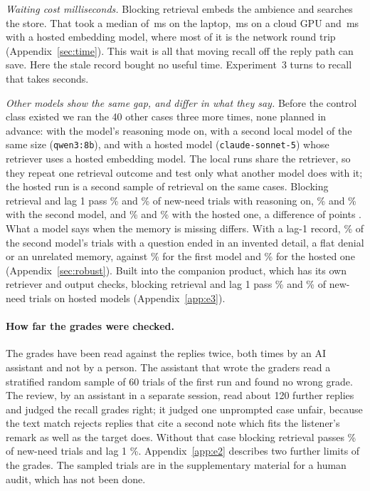 \documentclass[10pt]{article}
\begin{document}
\emph{Waiting cost milliseconds.} Blocking retrieval embeds the ambience and searches the store. That took a median of \PreBlockMed\,ms on the laptop, \CloudRecallMs\,ms on a cloud GPU and \HsRecallMs\,ms with a hosted embedding model, where most of it is the network round trip (Appendix~\ref{sec:time}). This wait is all that moving recall off the reply path can save. Here the stale record bought no useful time. Experiment~3 turns to recall that takes seconds.

\emph{Other models show the same gap, and differ in what they say.} Before the control class existed we ran the 40 other cases three more times, none planned in advance: with the model's reasoning mode on, with a second local model of the same size (\texttt{qwen3:8b}), and with a hosted model (\texttt{claude-sonnet-5}) whose retriever uses a hosted embedding model. The local runs share the retriever, so they repeat one retrieval outcome and test only what another model does with it; the hosted run is a second sample of retrieval on the same cases. Blocking retrieval and lag 1 pass \ThRecBlock\% and \ThRecLag\% of new-need trials with reasoning on, \QwRecBlock\% and \QwRecLag\% with the second model, and \HsRecBlock\% and \HsRecLag\% with the hosted one, a difference of \HsDiffBlockLag{} points \HsDiffBlockLagCI{}. What a model says when the memory is missing differs. With a lag-1 record, \QwOtherLag\% of the second model's trials with a question ended in an invented detail, a flat denial or an unrelated memory, against \OtherLag\% for the first model and \HsOtherLag\% for the hosted one (Appendix~\ref{sec:robust}). Built into the companion product, which has its own retriever and output checks, blocking retrieval and lag 1 pass \KHRecBlock\% and \KHRecLag\% of new-need trials on hosted models (Appendix~\ref{app:e3}).

\paragraph{How far the grades were checked.}
\label{sec:audit}
The grades have been read against the replies twice, both times by an AI assistant and not by a person. The assistant that wrote the graders read a stratified random sample of 60 trials of the first run and found no wrong grade. The review, by an assistant in a separate session, read about 120 further replies and judged the recall grades right; it judged one unprompted case unfair, because the text match rejects replies that cite a second note which fits the listener's remark as well as the target does. Without that case blocking retrieval passes \NoApprRecBlock\% of new-need trials and lag 1 \NoApprRecLag\%. Appendix~\ref{app:e2} describes two further limits of the grades. The sampled trials are in the supplementary material for a human audit, which has not been done.
\end{document}
